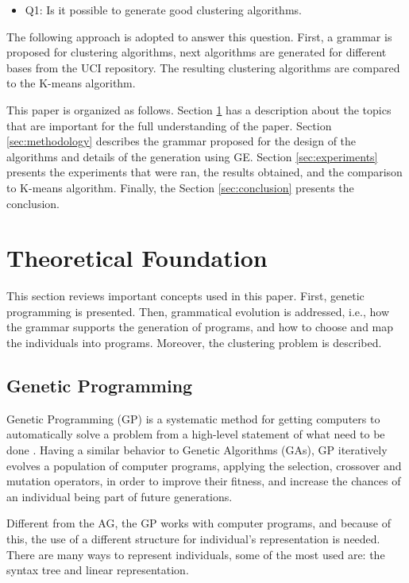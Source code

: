 \documentclass[journal]{IEEEtran}
\begin{document}
	\begin{itemize}
		\item Q1: Is it possible to generate good clustering algorithms.
	\end{itemize}
	
	The following approach is adopted to answer this question. First, a grammar is proposed for clustering algorithms, next algorithms are generated for different bases from the UCI repository. The resulting clustering algorithms are compared to the K-means algorithm.

	
	This paper is organized as follows. Section \ref{sec:theoretical_foudation} has a description about the topics that are important for the full understanding of the paper. Section \ref{sec:methodology}  describes the grammar proposed for the design of the algorithms and  details of the  generation using GE. Section \ref{sec:experiments} presents the experiments that were ran, the results obtained, and the comparison to K-means algorithm. Finally, the Section \ref{sec:conclusion} presents the conclusion.
	

	
	\section{Theoretical Foundation} \label{sec:theoretical_foudation}
	
	This section reviews important concepts used in this paper. First, genetic programming is presented. Then, grammatical evolution is addressed, i.e., how the grammar supports the generation of programs, and how to choose and map the individuals into programs. Moreover, the clustering problem is described.
	
	
	\subsection{Genetic Programming}
	
	Genetic Programming (GP) is a systematic method for getting computers to automatically solve a problem from a high-level statement of what need to be done \cite{koza2005genetic}. Having a similar behavior to Genetic Algorithms (GAs), GP iteratively evolves a population of computer programs, applying the selection, crossover and mutation operators, in order to improve their fitness, and increase the chances of an individual being part of future generations.
	
	Different from the AG, the GP works with computer programs, and because of this, the use of a different structure for individual's representation is needed. There are many ways to represent individuals, some of the most used are: the syntax tree and linear representation.
	
\end{document}
